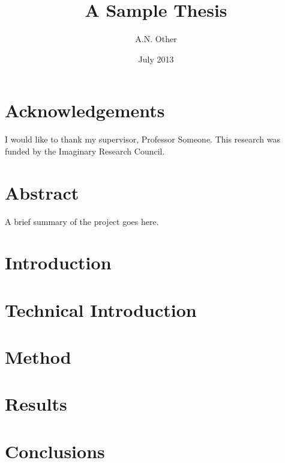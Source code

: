 \documentclass[oneside]{scrbook}
\title{A Sample Thesis}
\author{A.N. Other}
\date{July 2013}
\begin{document}
\maketitle

\frontmatter
\tableofcontents
\listoffigures
\listoftables

\chapter{Acknowledgements}
I would like to thank my supervisor, Professor Someone. This
research was funded by the Imaginary Research Council.

\chapter{Abstract}
A brief summary of the project goes here.
\blindtext
\blindtext
\blindtext
\blindtext
\blindtext
\blindtext

\mainmatter
\chapter{Introduction}
\label{ch:intro}

\chapter{Technical Introduction}
\label{ch:techintro}

\chapter{Method}
\label{ch:method}

\chapter{Results}
\label{ch:results}

\chapter{Conclusions}
\label{ch:conc}

\backmatter
\end{document}
